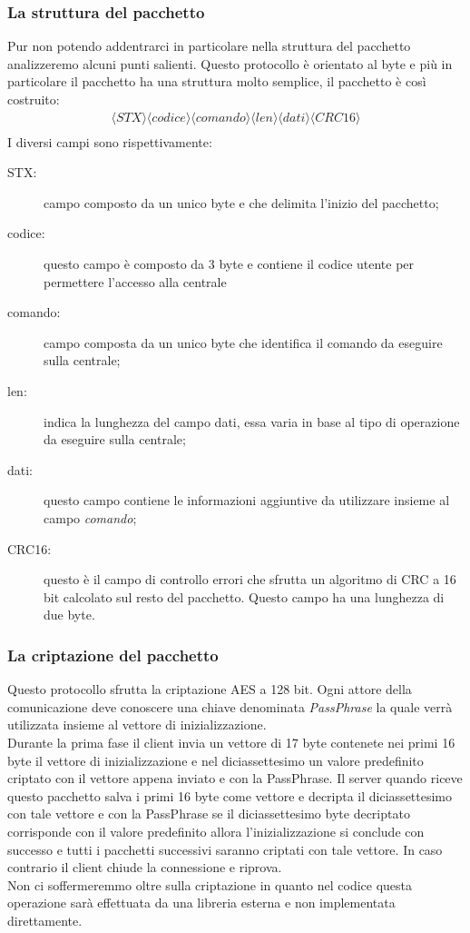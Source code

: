 \subsubsection{La struttura del pacchetto}
Pur non potendo addentrarci in particolare nella struttura del pacchetto analizzeremo alcuni punti salienti. Questo protocollo è orientato al byte e più in particolare il pacchetto ha una struttura molto semplice, il pacchetto è così costruito:
$$
\begin{array}{c}
\langle STX\rangle\langle codice\rangle\langle comando\rangle\langle len\rangle\langle dati\rangle\langle CRC16\rangle\\
\end{array}	 
$$
I diversi campi sono rispettivamente:
\begin{description}
	\item[STX:] campo composto da un unico byte e che delimita l'inizio del pacchetto;
	\item[codice:] questo campo è composto da 3 byte e contiene il codice utente per permettere l'accesso alla centrale
	\item[comando:] campo composta da un unico byte che identifica il comando da eseguire sulla centrale;
	\item[len:] indica la lunghezza del campo dati, essa varia in base al tipo di operazione da eseguire sulla centrale;
	\item[dati:] questo campo contiene le informazioni aggiuntive da utilizzare insieme al campo \emph{comando};
	\item[CRC16:] questo è il campo di controllo errori che sfrutta un algoritmo di CRC a 16 bit calcolato sul resto del pacchetto. Questo campo ha una lunghezza di due byte.
\end{description}
\subsubsection{La criptazione del pacchetto}
Questo protocollo sfrutta la criptazione AES a 128 bit. Ogni attore della comunicazione deve conoscere una chiave denominata \emph{PassPhrase} la quale verrà utilizzata insieme al vettore di inizializzazione.\\
Durante la prima fase il client invia un vettore di 17 byte contenete nei primi 16 byte il vettore di inizializzazione e nel diciassettesimo un valore predefinito criptato con il vettore appena inviato e con la PassPhrase. Il server quando riceve questo pacchetto salva i primi 16 byte come vettore e decripta il diciassettesimo con tale vettore e con la PassPhrase se il diciassettesimo byte decriptato corrisponde con il valore predefinito allora l'inizializzazione si conclude con successo e tutti i pacchetti successivi saranno criptati con tale vettore. In caso contrario il client chiude la connessione e riprova.\\
Non ci soffermeremmo oltre sulla criptazione in quanto nel codice questa operazione sarà effettuata da una libreria esterna e non implementata direttamente.
